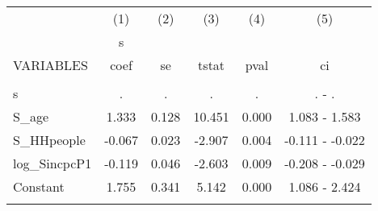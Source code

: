 \documentclass[]{article}
\begin{document}
\begin{tabular}{lccccc} \hline
 & (1) & (2) & (3) & (4) & (5) \\
 & s &  &  &  &  \\
VARIABLES & coef & se & tstat & pval & ci \\ \hline
 &  &  &  &  &  \\
s & . & . & . & . & . - . \\
S\_age & 1.333 & 0.128 & 10.451 & 0.000 & 1.083 - 1.583 \\
S\_HHpeople & -0.067 & 0.023 & -2.907 & 0.004 & -0.111 - -0.022 \\
log\_SincpcP1 & -0.119 & 0.046 & -2.603 & 0.009 & -0.208 - -0.029 \\
Constant & 1.755 & 0.341 & 5.142 & 0.000 & 1.086 - 2.424 \\
 &  &  &  &  &  \\ \hline
\end{tabular}
\end{document}
